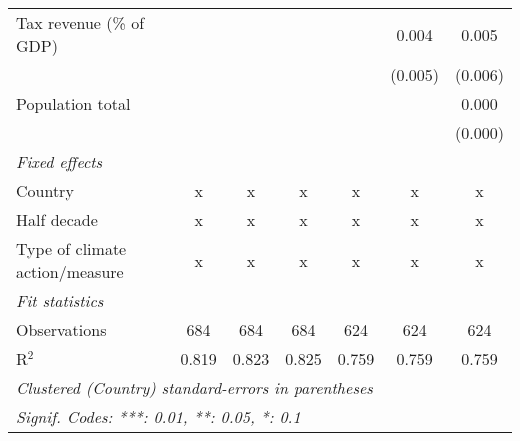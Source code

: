 \begin{tabular}{lcccccc}
   Tax revenue (\% of GDP)                                 &              &               &               &               & 0.004         & 0.005\\   
                                                           &              &               &               &               & (0.005)       & (0.006)\\   
   Population total                                        &              &               &               &               &               & 0.000\\   
                                                           &              &               &               &               &               & (0.000)\\   
   \emph{Fixed effects}\\
   Country                                                 & x            & x             & x             & x             & x             & x\\  
   Half decade                                             & x            & x             & x             & x             & x             & x\\  
   Type of climate action/measure                          & x            & x             & x             & x             & x             & x\\  
   \midrule \emph{Fit statistics}\\
   Observations                                            & 684          & 684           & 684           & 624           & 624           & 624\\  
   R$^2$                                                   & 0.819        & 0.823         & 0.825         & 0.759         & 0.759         & 0.759\\  
   \midrule
   \multicolumn{7}{l}{\emph{Clustered (Country) standard-errors in parentheses}}\\
   \multicolumn{7}{l}{\emph{Signif. Codes: ***: 0.01, **: 0.05, *: 0.1}}\\
\end{tabular}
\par\endgroup



